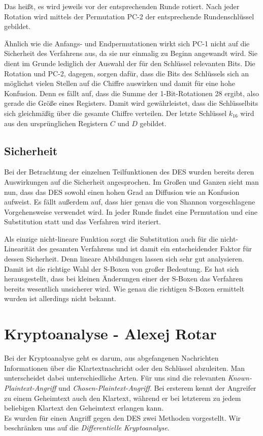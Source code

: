 \documentclass[
10pt, %
a4paper, %
oneside, %
headinclude,footinclude, %
BCOR5mm, %
]{scrartcl}
\begin{document}
\begin{1}[ht]
	

	Das heißt, es wird jeweils vor der entsprechenden Runde rotiert. Nach jeder Rotation wird mittels der Permutation PC-2 der entsprechende Rundenschlüssel gebildet.

	Ähnlich wie die Anfangs- und Endpermutationen wirkt sich PC-1 nicht auf die Sicherheit des Verfahrens aus, da sie nur einmalig zu Beginn angewandt wird. Sie dient im Grunde lediglich der Auswahl der für den Schlüssel relevanten Bits. \cite[141]{3} Die Rotation und PC-2, dagegen, sorgen dafür, dass die Bits des Schlüssels sich an möglichst vielen Stellen auf die Chiffre auswirken und damit für eine hohe Konfusion. Denn es fällt auf, dass die Summe der 1-Bit-Rotationen 28 ergibt, also gerade die Größe eines Registers. Damit wird gewährleistet, dass die Schlüsselbits sich gleichmäßig über die gesamte Chiffre verteilen. Der letzte Schlüssel $k_{16}$ wird aus den ursprünglichen Registern $C$ und $D$ gebildet.
	
	\subsection{Sicherheit}
	Bei der Betrachtung der einzelnen Teilfunktionen des DES wurden bereits deren Auswirkungen auf die Sicherheit angesprochen. Im Großen und Ganzen sieht man nun, dass das DES sowohl einen hohen Grad an Diffusion wie an Konfusion aufweist. Es fällt außerdem auf, dass hier genau die von Shannon vorgeschlagene Vorgehensweise verwendet wird. In jeder Runde findet eine Permutation und eine Substitution statt und das Verfahren wird iteriert. 

	Als einzige nicht-lineare Funktion sorgt die Substitution auch für die nicht-Linearität des gesamten Verfahrens und ist damit ein entscheidender Faktor für dessen Sicherheit. Denn lineare Abbildungen lassen sich sehr gut analysieren. \cite[21]{2} Damit ist die richtige Wahl der S-Boxen von großer Bedeutung. Es hat sich herausgestellt, dass bei kleinen Änderungen einer der S-Boxen das Verfahren bereits wesentlich unsicherer wird. Wie genau die richtigen S-Boxen ermittelt wurden ist allerdings nicht bekannt. \cite[52]{2}

\section{Kryptoanalyse - Alexej Rotar}
	Bei der Kryptoanalyse geht es darum, aus abgefangenen Nachrichten Informationen über die Klartextnachricht oder den Schlüssel abzuleiten. Man unterscheidet dabei unterschiedliche Arten. Für uns sind die relevanten \emph{Known-Plaintext-Angriff} und \emph{Chosen-Plaintext-Angriff}. Bei ersterem kennt der Angreifer zu einem Geheimtext auch den Klartext, während er bei letzterem zu jedem beliebigen Klartext den Geheimtext erlangen kann. \cite[24]{1} \\
	Es wurden für einen Angriff gegen den DES zwei Methoden vorgestellt. Wir beschränken uns auf die \emph{Differentielle Kryptoanalyse}.


\end{1}
\end{document}
